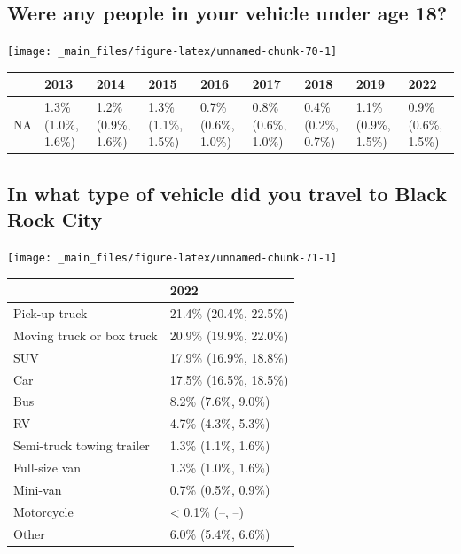 \documentclass[
]{book}
\begin{document}
\hypertarget{were-any-people-in-your-vehicle-under-age-18}{%
\subsection{Were any people in your vehicle under age 18?}\label{were-any-people-in-your-vehicle-under-age-18}}

\texttt{[image: \_main\_files/figure-latex/unnamed-chunk-70-1]}

\begin{table}
\centering
\begin{tabular}[t]{>{}l|>{}l|>{}l|>{}l|>{}l|>{}l|>{}l|>{}l|>{}l}
\hline
  & 2013 & 2014 & 2015 & 2016 & 2017 & 2018 & 2019 & 2022\\
\hline
NA & 1.3\% (1.0\%, 1.6\%) & 1.2\% (0.9\%, 1.6\%) & 1.3\% (1.1\%, 1.5\%) & 0.7\% (0.6\%, 1.0\%) & 0.8\% (0.6\%, 1.0\%) & 0.4\% (0.2\%, 0.7\%) & 1.1\% (0.9\%, 1.5\%) & 0.9\% (0.6\%, 1.5\%)\\
\hline
\end{tabular}
\end{table}

\hypertarget{in-what-type-of-vehicle-did-you-travel-to-black-rock-city}{%
\subsection{In what type of vehicle did you travel to Black Rock City}\label{in-what-type-of-vehicle-did-you-travel-to-black-rock-city}}

\texttt{[image: \_main\_files/figure-latex/unnamed-chunk-71-1]}

\begin{table}
\centering
\begin{tabular}[t]{>{}l|>{}l}
\hline
  & 2022\\
\hline
Pick-up truck & 21.4\% (20.4\%, 22.5\%)\\
\hline
Moving truck or box truck & 20.9\% (19.9\%, 22.0\%)\\
\hline
SUV & 17.9\% (16.9\%, 18.8\%)\\
\hline
Car & 17.5\% (16.5\%, 18.5\%)\\
\hline
Bus & 8.2\% (7.6\%, 9.0\%)\\
\hline
RV & 4.7\% (4.3\%, 5.3\%)\\
\hline
Semi-truck towing trailer & 1.3\% (1.1\%, 1.6\%)\\
\hline
Full-size van & 1.3\% (1.0\%, 1.6\%)\\
\hline
Mini-van & 0.7\% (0.5\%, 0.9\%)\\
\hline
Motorcycle & < 0.1\% (--, --)\\
\hline
Other & 6.0\% (5.4\%, 6.6\%)\\
\hline
\end{tabular}
\end{table}
\end{document}

